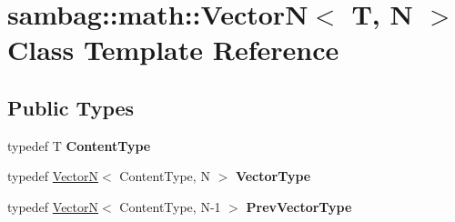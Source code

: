 \hypertarget{classsambag_1_1math_1_1_vector_n}{
\section{sambag::math::VectorN$<$ T, N $>$ Class Template Reference}
\label{classsambag_1_1math_1_1_vector_n}
}
\subsection*{Public Types}
\begin{DoxyCompactItemize}
\item 
\hypertarget{classsambag_1_1math_1_1_vector_n_a0feb658618b4ca946819a700d88fca69}{
typedef T {\bfseries ContentType}}
\label{classsambag_1_1math_1_1_vector_n_a0feb658618b4ca946819a700d88fca69}

\item 
\hypertarget{classsambag_1_1math_1_1_vector_n_a015c5132dacb312df8452d4d8bcf9a2e}{
typedef \hyperlink{classsambag_1_1math_1_1_vector_n}{VectorN}$<$ ContentType, N $>$ {\bfseries VectorType}}
\label{classsambag_1_1math_1_1_vector_n_a015c5132dacb312df8452d4d8bcf9a2e}

\item 
\hypertarget{classsambag_1_1math_1_1_vector_n_a3717e4f08987b1a0b8804a127fdc8973}{
typedef \hyperlink{classsambag_1_1math_1_1_vector_n}{VectorN}$<$ ContentType, N-\/1 $>$ {\bfseries PrevVectorType}}
\label{classsambag_1_1math_1_1_vector_n_a3717e4f08987b1a0b8804a127fdc8973}

\end{DoxyCompactItemize}
